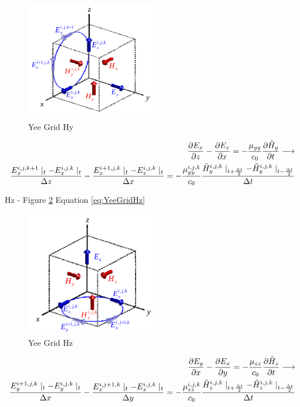 \documentclass[a4paper,10pt]{article}
\begin{document}
\begin{figure}[h]
  \centering
    \includegraphics[width=0.5\textwidth]{YeeGridHy.png}
  \caption{Yee Grid Hy}
  \label{fig:YeeGridHy}
\end{figure}

\begin{align}
  \label{eq:YeeGridHy}
  \frac{\partial E_x}{\partial z} - \frac{\partial E_z}{\partial x} = -\frac{\mu_{yy}}{c_0}\frac{\partial\tilde{H}_y}{\partial t}
  \longrightarrow\\
  \frac{E_{x}^{i,j,k+1}\mid_{t} - E_{x}^{i,j,k}\mid_{t}}{\Delta z} - \frac{E_{z}^{i+1,j,k}\mid_{t} - E_{z}^{i,j,k}\mid_{t}}{\Delta x} = -\frac{\mu_{yy}^{i,j,k}}{c_0} \frac{\tilde{H}_{y}^{i,j,k}\mid_{t+\frac  {\Delta t}{2}} - \tilde{H}_{y}^{i,j,k}\mid_{t-\frac{\Delta t}{2}}}{\Delta t}\notag
\end{align}


Hz - Figure \ref{fig:YeeGridHz} Equation \eqref{eq:YeeGridHz} 

\begin{figure}[h]
  \centering
    \includegraphics[width=0.5\textwidth]{YeeGridHz.png}
  \caption{Yee Grid Hz}
  \label{fig:YeeGridHz}
\end{figure}

\begin{align}
  \label{eq:YeeGridHz}
  \frac{\partial E_y}{\partial x} - \frac{\partial E_x}{\partial y} = -\frac{\mu_{zz}}{c_0}\frac{\partial\tilde{H}_z}{\partial t}
  \longrightarrow\\
  \frac{E_{y}^{i+1,j,k}\mid_{t} - E_{y}^{i,j,k}\mid_{t}}{\Delta x} - \frac{E_{x}^{i,j+1,k}\mid_{t} - E_{x}^{i,j,k}\mid_{t}}{\Delta y} = -\frac{\mu_{zz}^{i,j,k}}{c_0} \frac{\tilde{H}_{z}^{i,j,k}\mid_{t+\frac  {\Delta t}{2}} - \tilde{H}_{z}^{i,j,k}\mid_{t-\frac{\Delta t}{2}}}{\Delta t}\notag
\end{align}
\end{document}
